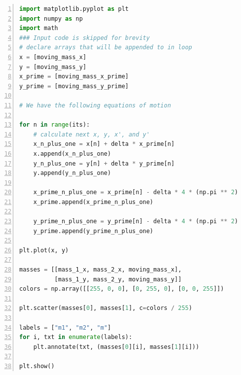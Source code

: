 \documentclass[preprint,titlepage,preprintnumbers,amsmath,amssymb,aps,11pt]{revtex4-2}
\begin{document}
\begin{lstlisting}[language=Python, numbers=left, breaklines=true]
import matplotlib.pyplot as plt
import numpy as np
import math
### Input code is skipped for brevity
# declare arrays that will be appended to in loop
x = [moving_mass_x]
y = [moving_mass_y]
x_prime = [moving_mass_x_prime]
y_prime = [moving_mass_y_prime]

# We have the following equations of motion

for n in range(its):
    # calculate next x, y, x', and y'
    x_n_plus_one = x[n] + delta * x_prime[n]
    x.append(x_n_plus_one)
    y_n_plus_one = y[n] + delta * y_prime[n]
    y.append(y_n_plus_one)

    x_prime_n_plus_one = x_prime[n] - delta * 4 * (np.pi ** 2) * (x[n + 1] / np.power((x[n + 1] ** 2) + (y[n + 1] ** 2), 3 / 2) + alpha * (x[n+1] - mass_2_x) / np.power((x[n + 1] - mass_2_x) ** 2 + y[n + 1] ** 2, 3 / 2))
    x_prime.append(x_prime_n_plus_one)

    y_prime_n_plus_one = y_prime[n] - delta * 4 * (np.pi ** 2) * y[n + 1] * (1 / np.power((x[n + 1] ** 2) + (y[n + 1] ** 2), 3 / 2) + 1 / np.power((x[n + 1] - mass_2_x) ** 2 + y[n + 1] ** 2, 3 / 2))
    y_prime.append(y_prime_n_plus_one)

plt.plot(x, y)

masses = [[mass_1_x, mass_2_x, moving_mass_x],
          [mass_1_y, mass_2_y, moving_mass_y]]
colors = np.array([[255, 0, 0], [0, 255, 0], [0, 0, 255]])

plt.scatter(masses[0], masses[1], c=colors / 255)

labels = ["m1", "m2", "m"]
for i, txt in enumerate(labels):
    plt.annotate(txt, (masses[0][i], masses[1][i]))

plt.show()

\end{lstlisting}


\end{document}
